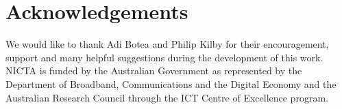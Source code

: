 \section{Acknowledgements}
We would like to thank Adi Botea and Philip Kilby for their encouragement,
support and many helpful suggestions during the development of this work.
NICTA is funded by the Australian Government as represented by the Department of 
Broadband, Communications and the Digital Economy and the Australian Research 
Council through the ICT Centre of Excellence program.
